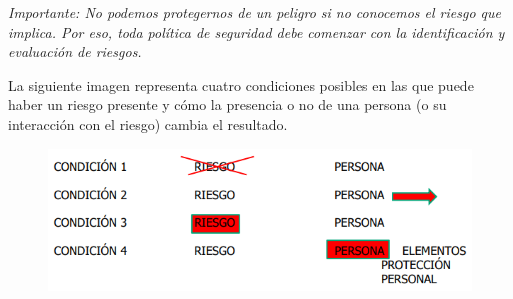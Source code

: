 \documentclass[a4paper,oneside,11pt]{article}
\begin{document}
\textit{Importante: No podemos protegernos de un peligro si no conocemos el riesgo que implica. Por eso, toda política de seguridad debe comenzar con la identificación y evaluación de riesgos.}

La siguiente imagen representa cuatro condiciones posibles en las que puede haber un riesgo presente y cómo la presencia o no de una persona (o su interacción con el riesgo) cambia el resultado.

\begin{figure} [ht!]
    \centering
    \includegraphics[scale=1]{riego persona.png}
\end{figure}
\end{document}
